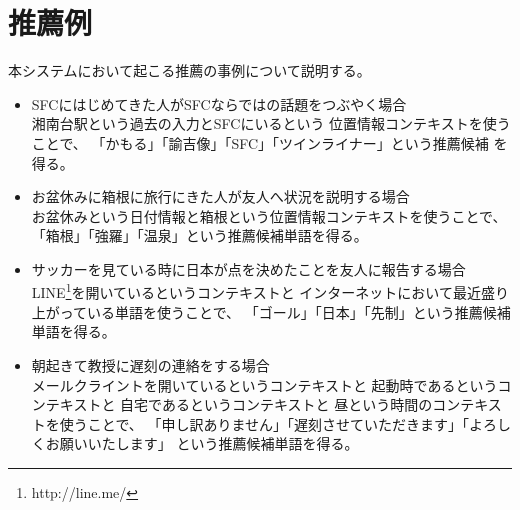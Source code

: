 \section{推薦例}
本システムにおいて起こる推薦の事例について説明する。
\begin{itemize}
  \item SFCにはじめてきた人がSFCならではの話題をつぶやく場合\mbox{}\\
    湘南台駅という過去の入力とSFCにいるという
    位置情報コンテキストを使うことで、
    「かもる」「諭吉像」「SFC」「ツインライナー」という推薦候補
    を得る。
  \item お盆休みに箱根に旅行にきた人が友人へ状況を説明する場合\mbox{}\\
    お盆休みという日付情報と箱根という位置情報コンテキストを使うことで、
    「箱根」「強羅」「温泉」という推薦候補単語を得る。
  \item サッカーを見ている時に日本が点を決めたことを友人に報告する場合\mbox{}\\
    LINE\footnote{http://line.me/}を開いているというコンテキストと
    インターネットにおいて最近盛り上がっている単語を使うことで、
    「ゴール」「日本」「先制」という推薦候補単語を得る。
  \item 朝起きて教授に遅刻の連絡をする場合\mbox{}\\
    メールクライントを開いているというコンテキストと
    起動時であるというコンテキストと
    自宅であるというコンテキストと
    昼という時間のコンテキストを使うことで、
    「申し訳ありません」「遅刻させていただきます」「よろしくお願いいたします」
    という推薦候補単語を得る。
\end{itemize}
